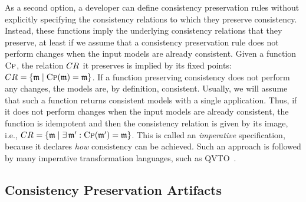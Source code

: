 As a second option, a developer can define consistency preservation rules without explicitly specifying the consistency relations to which they preserve consistency.
Instead, these functions imply the underlying consistency relations that they preserve, at least if we assume that a consistency preservation rule does not perform changes when the input models are already consistent.
Given a function $\textsc{Cp}$, the relation $\consistencyrelation{CR}{}$ it preserves is implied by its fixed points: $\consistencyrelation{CR}{} = \setted{\modeltuple{m} \mid \function{Cp}(\modeltuple{m}) = \modeltuple{m}}$.
If a function preserving consistency does not perform any changes, the models are, by definition, consistent.
Usually, we will assume that such a function returns consistent models with a single application.
Thus, if it does not perform changes when the input models are already consistent, the function is idempotent and then the consistency relation is given by its image, i.e., $\consistencyrelation{CR}{} = \setted{\modeltuple{m} \mid \exists \modeltuple{m}' : \function{Cp}(\modeltuple{m}') = \modeltuple{m}}$.
This is called an \emph{imperative} specification, because it declares \emph{how} consistency can be achieved.
Such an approach is followed by many imperative transformation languages, such as \gls{QVTO}~\cite{qvt}. %


\subsection{Consistency Preservation Artifacts}

